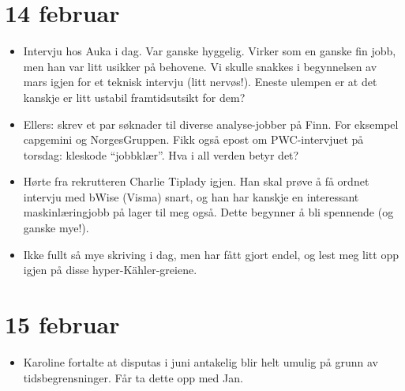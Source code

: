 \documentclass[11pt, norsk]{article}
\begin{document}

\section{14 februar} %
\label{sec:14_februar}

\begin{itemize}
  \item Intervju hos Auka i dag. Var ganske hyggelig. Virker som en ganske fin jobb, men han var litt usikker på behovene. Vi skulle snakkes i begynnelsen av mars igjen for et teknisk intervju (litt nervøs!). Eneste ulempen er at det kanskje er litt ustabil framtidsutsikt for dem?
  \item Ellers: skrev et par søknader til diverse analyse-jobber på Finn. For eksempel capgemini og NorgesGruppen. Fikk også epost om PWC-intervjuet på torsdag: kleskode ``jobbklær''. Hva i all verden betyr det?
  \item Hørte fra rekrutteren Charlie Tiplady igjen. Han skal prøve å få ordnet intervju med bWise (Visma) snart, og han har kanskje en interessant maskinlæringjobb på lager til meg også. Dette begynner å bli spennende (og ganske mye!).
  \item Ikke fullt så mye skriving i dag, men har fått gjort endel, og lest meg litt opp igjen på disse hyper-Kähler-greiene.
\end{itemize}


\section{15 februar} %
\label{sec:15_februar}

\begin{itemize}
  \item Karoline fortalte at disputas i juni antakelig blir helt umulig på grunn av tidsbegrensninger. Får ta dette opp med Jan.
\end{itemize}
\end{document}
